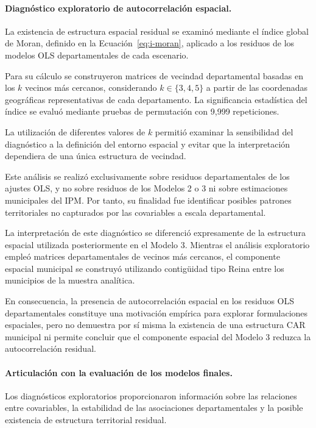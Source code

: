 \paragraph{Diagnóstico exploratorio de autocorrelación espacial.}

La existencia de estructura espacial residual se examinó mediante el índice global de Moran, definido en la Ecuación~\ref{eq:i-moran}, aplicado a los residuos de los modelos OLS departamentales de cada escenario.

Para su cálculo se construyeron matrices de vecindad departamental basadas en los $k$ vecinos más cercanos, considerando $k\in\{3,4,5\}$ a partir de las coordenadas geográficas representativas de cada departamento. La significancia estadística del índice se evaluó mediante pruebas de permutación con 9{,}999 repeticiones.

La utilización de diferentes valores de $k$ permitió examinar la sensibilidad del diagnóstico a la definición del entorno espacial y evitar que la interpretación dependiera de una única estructura de vecindad.

Este análisis se realizó exclusivamente sobre residuos departamentales de los ajustes OLS, y no sobre residuos de los Modelos 2 o 3 ni sobre estimaciones municipales del IPM. Por tanto, su finalidad fue identificar posibles patrones territoriales no capturados por las covariables a escala departamental.

La interpretación de este diagnóstico se diferenció expresamente de la estructura espacial utilizada posteriormente en el Modelo 3. Mientras el análisis exploratorio empleó matrices departamentales de vecinos más cercanos, el componente espacial municipal se construyó utilizando contigüidad tipo Reina entre los municipios de la muestra analítica.

En consecuencia, la presencia de autocorrelación espacial en los residuos OLS departamentales constituye una motivación empírica para explorar formulaciones espaciales, pero no demuestra por sí misma la existencia de una estructura CAR municipal ni permite concluir que el componente espacial del Modelo 3 reduzca la autocorrelación residual.

\paragraph{Articulación con la evaluación de los modelos finales.}

Los diagnósticos exploratorios proporcionaron información sobre las relaciones entre covariables, la estabilidad de las asociaciones departamentales y la posible existencia de estructura territorial residual.

